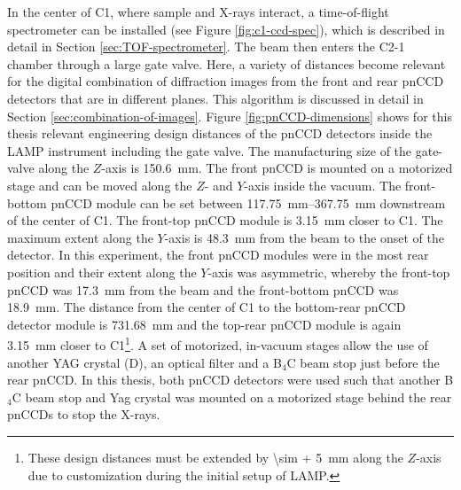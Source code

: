 In the center of C1, where sample and X-rays interact, a time-of-flight spectrometer can be installed (see Figure \ref{fig:c1-ccd-spec}), which is described in detail in Section \ref{sec:TOF-spectrometer}. The beam then enters the C2-1 chamber through a large gate valve. Here, a variety of distances become relevant for the digital combination of diffraction images from the front and rear pnCCD detectors that are in different planes. This algorithm is discussed in detail in Section \ref{sec:combination-of-images}. Figure \ref{fig:pnCCD-dimensions} shows for this thesis relevant engineering design distances of the pnCCD detectors inside the LAMP instrument including the gate valve. The manufacturing size of the gate-valve along the $Z$-axis is \SI{150.6}{\milli\meter}. The front pnCCD is mounted on a motorized stage and can be moved along the $Z$- and $Y$-axis inside the vacuum. The front-bottom pnCCD module can be set between \SIrange{117.75}{367.75}{\milli\meter} downstream of the center of C1. The front-top pnCCD module is \SI{3.15}{\milli\meter} closer to C1. The maximum extent along the $Y$-axis is \SI{48.3}{\milli\meter} from the beam to the onset of the detector. In this experiment, the front pnCCD modules were in the most rear position and their extent along the $Y$-axis was asymmetric, whereby the front-top pnCCD was \SI{17.3}{\milli\meter} from the beam and the front-bottom pnCCD was \SI{18.9}{\milli\meter}. The distance from the center of C1 to the bottom-rear pnCCD detector module is \SI{731.68}{\milli\meter} and the top-rear pnCCD module is again \SI{3.15}{\milli\meter} closer to C1\footnote{These design distances must be extended by \SI{\sim + 5}{\milli\meter} along the $Z$-axis due to customization during the initial setup of LAMP.}. A set of motorized, in-vacuum stages allow the use of another YAG crystal (D), an optical filter and a B$_{4}$C beam stop just before the rear pnCCD. In this thesis, both pnCCD detectors were used such that another B$_{4}$C beam stop and Yag crystal was mounted on a motorized stage behind the rear pnCCDs to stop the X-rays.
%
%
%
